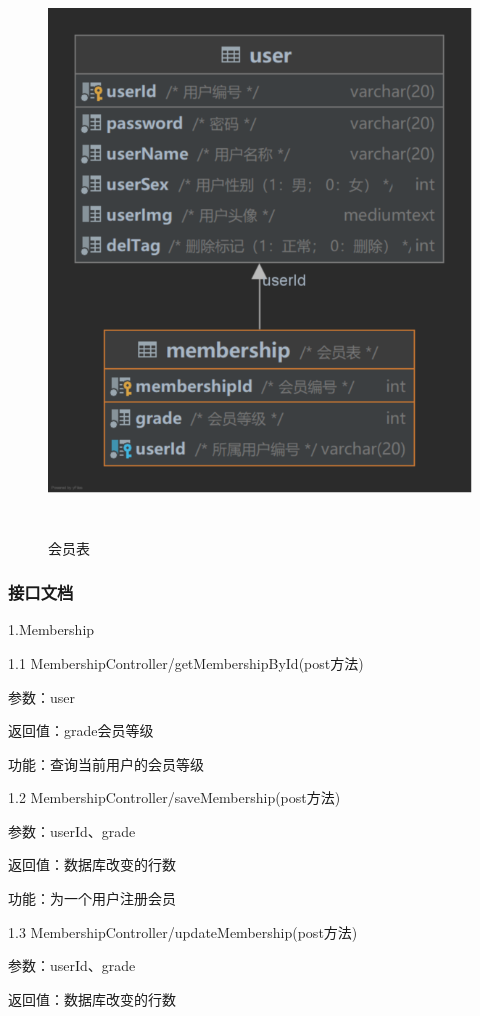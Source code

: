 \begin{figure}[H]
    \centering
    \includegraphics[width=13cm,height=15cm]{figures/table3.png}
    \caption{会员表}
\end{figure}

\subsubsection{接口文档}
1.Membership

1.1 MembershipController/getMembershipById(post方法)

参数：user

返回值：grade会员等级

功能：查询当前用户的会员等级

1.2 MembershipController/saveMembership(post方法)

参数：userId、grade

返回值：数据库改变的行数

功能：为一个用户注册会员

1.3 MembershipController/updateMembership(post方法)

参数：userId、grade

返回值：数据库改变的行数

